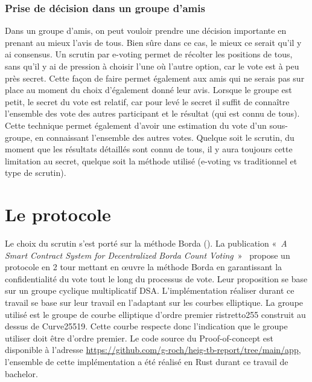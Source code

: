 \documentclass[../report]{subfiles}
\begin{document}
\subsection{Prise de décision dans un groupe d'amis}

Dans un groupe d'amis, on peut vouloir prendre une décision importante en prenant au mieux l'avis de tous. 
Bien sûre dans ce cas, le mieux ce serait qu'il y ai consensus.
Un scrutin par e-voting permet de récolter les positions de tous, sans qu'il y ai de pression à choisir l'une où 
l'autre option, car le vote est à peu près secret. 
Cette façon de faire permet également aux amis qui ne serais pas sur place au moment du choix d'également donné leur avis.
Lorsque le groupe est petit, le secret du vote est relatif, car pour levé le secret il suffit de connaître l'ensemble des
vote des autres participant et le résultat (qui est connu de tous).
Cette technique permet également d'avoir une estimation du vote d'un sous-groupe, en connaissant l'ensemble des autres votes.
Quelque soit le scrutin, du moment que les résultats détaillés sont connu de tous, il y aura toujours cette limitation au secret, 
quelque soit la méthode utilisé (e-voting vs traditionnel et type de scrutin).

%



\chapter{Le protocole}

Le choix du scrutin s'est porté sur la méthode Borda ().
La publication «~\emph{A Smart Contract System for Decentralized Borda Count Voting}~»~\cite{panja_smart_2020}
propose un protocole en 2 tour mettant en œuvre la méthode Borda en garantissant la
confidentialité du vote tout le long du processus de vote.
Leur proposition se base sur un groupe cyclique multiplicatif DSA. 
L'implémentation réaliser durant ce travail se base sur leur travail en l'adaptant sur les courbes elliptique.
La groupe utilisé est le groupe de courbe elliptique d'ordre premier ristretto255 construit au dessus de Curve25519.
Cette courbe respecte donc l'indication que le groupe utiliser doit être d'ordre premier.
Le code source du Proof-of-concept est disponible à l'adresse \url{https://github.com/g-roch/heig-tb-report/tree/main/app},
l'ensemble de cette implémentation a été réalisé en Rust durant ce travail de bachelor.
\end{document}
